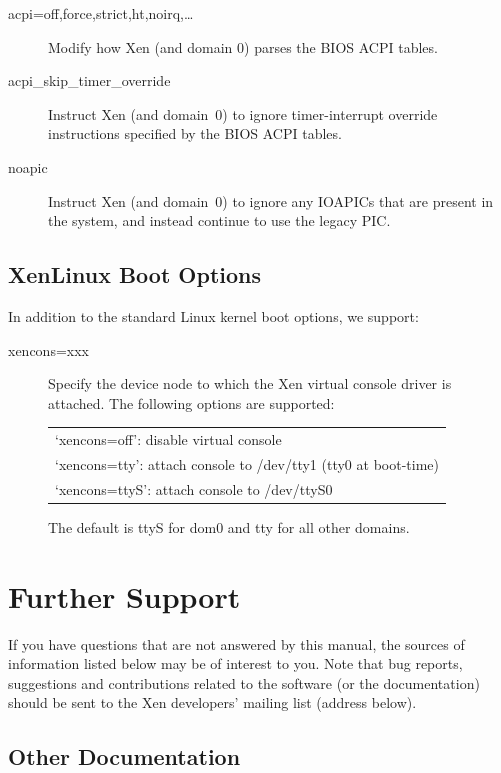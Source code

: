\documentclass[11pt,twoside,final,openright]{report}
\begin{document}
\begin{description}
\item [ acpi=off,force,strict,ht,noirq,\ldots ] Modify how Xen (and
  domain 0) parses the BIOS ACPI tables.
\item [ acpi\_skip\_timer\_override ] Instruct Xen (and domain~0) to
  ignore timer-interrupt override instructions specified by the BIOS
  ACPI tables.
\item [ noapic ] Instruct Xen (and domain~0) to ignore any IOAPICs
  that are present in the system, and instead continue to use the
  legacy PIC.
\end{description} 


\section{XenLinux Boot Options}

In addition to the standard Linux kernel boot options, we support:
\begin{description}
\item[ xencons=xxx ] Specify the device node to which the Xen virtual
  console driver is attached. The following options are supported:
  \begin{center}
    \begin{tabular}{l}
      `xencons=off': disable virtual console \\
      `xencons=tty': attach console to /dev/tty1 (tty0 at boot-time) \\
      `xencons=ttyS': attach console to /dev/ttyS0
    \end{tabular}
\end{center}
The default is ttyS for dom0 and tty for all other domains.
\end{description}


\chapter{Further Support}

If you have questions that are not answered by this manual, the
sources of information listed below may be of interest to you.  Note
that bug reports, suggestions and contributions related to the
software (or the documentation) should be sent to the Xen developers'
mailing list (address below).


\section{Other Documentation}
\end{document}
